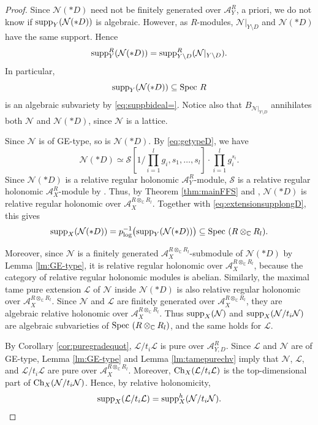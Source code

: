 \documentclass{amsart}
\theoremstyle{plain}
\numberwithin{theorem}{section}
\theoremstyle{definition}
\theoremstyle{remark}
\theoremstyle{definition}
\newcommand{\C}{\mathbb{C}} %
\newcommand{\cL}{\mathcal{L}}
\newcommand{\cN}{\mathcal{N}}
\newcommand{\cS}{\mathcal{S}}
\newcommand{\sA}{\mathscr{A}}
\newcommand{\Spec}{\textup{Spec }}
\newcommand{\supp}{\textup{supp}}
\newcommand{\Ch}{\textup{Ch}}
\begin{document}
\begin{proof}
Since $\cN(*D)$ need not be finitely generated over $\sA_Y^R$, 
a priori, we do not know if $\supp_Y(\cN(*D))$ is algebraic. However, as $R$-modules, $\cN|_{Y\setminus D}$ and $\cN(*D)$ have the same support. Hence
\begin{equation}\label{eq:extensionsupplongD}
\supp^R_Y(\cN(*D))
=
\supp^R_{Y\setminus D}(\cN|_{Y\setminus D}).
\end{equation}
In particular,
\[
\supp_Y(\cN(*D))\subseteq \Spec R
\]
is an algebraic subvariety by \eqref{eq:suppbideal=}. Notice also that $B_{\cN|_{Y\setminus D}}$ annihilates both $\cN$ and $\cN(*D)$, since $\cN$ is a lattice.

Since $\cN$ is of GE-type, so is $\cN(*D)$. By \eqref{eq:getypeD}, we have
\[
\cN(*D)
\simeq
\cS\left[
1/\prod_{i=1}^l g_i,
s_1,\dots,s_l
\right]\cdot
\prod_{i=1}^l g_i^{s_i}.
\]
Since $\cN(*D)$ is a relative regular holonomic $\sA_Y^R$-module, $\cS$ is a relative regular holonomic $\sA_X^R$-module by \cite[Thm.1]{FFS23}. Thus, by Theorem \ref{thm:mainFFS} and \cite[Prop.4.34]{FFS23}, $\cN(*D)$ is relative regular holonomic over $\sA_X^{R\otimes_\C R_l}$. Together with \eqref{eq:extensionsupplongD}, this gives
\begin{equation}\label{eq:pullbacksupp*D}
\supp_X(\cN(*D))
=
p_{\log}^{-1}\big(\supp_Y(\cN(*D))\big)
\subseteq
\Spec(R\otimes_\C R_l).
\end{equation}

Moreover, since $\cN$ is a finitely generated $\sA_X^{R\otimes_\C R_l}$-submodule of $\cN(*D)$ by Lemma \ref{lm:GE-type}, it is relative regular holonomic over $\sA_X^{R\otimes_\C R_l}$, because the category of relative regular holonomic modules is abelian. Similarly, the maximal tame pure extension $\cL$ of $\cN$ inside $\cN(*D)$ is also relative regular holonomic over $\sA_X^{R\otimes_\C R_l}$. Since $\cN$ and $\cL$ are finitely generated over $\sA_X^{R\otimes_\C R_l}$, they are algebraic relative holonomic over $\sA_X^{R\otimes_\C R_l}$. Thus $\supp_X(\cN)$ and $\supp_X(\cN/t_i\cN)$ are algebraic subvarieties of $\Spec(R\otimes_\C R_l)$, and the same holds for $\cL$.

By Corollary \ref{cor:puregradequot}, $\cL/t_i\cL$ is pure over $\sA_{Y,D}^R$. Since $\cL$ and $\cN$ are of GE-type, Lemma \ref{lm:GE-type} and Lemma \ref{lm:tamepurechv} imply that $\cN$, $\cL$, and $\cL/t_i\cL$ are pure over $\sA_X^{R\otimes_\C R_l}$. Moreover, $\Ch_X(\cL/t_i\cL)$ is the top-dimensional part of $\Ch_X(\cN/t_i\cN)$. Hence, by relative holonomicity,
\[
\supp_X(\cL/t_i\cL)
=
\supp^h_X(\cN/t_i\cN).
\]


\end{proof}
\end{document}

